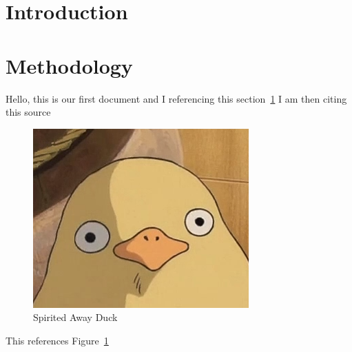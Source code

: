 \documentclass[11pt]{article}
\begin{document}
    \section{Introduction}\label{sec:introduction}

    \section{Methodology}\label{sec:methodology}

    Hello, this is our first document and I referencing this section~\ref{sec:introduction}
    I am then citing this source~\cite{ani2019victory}

    \begin{figure}
        \centering
        \includegraphics{figures/SpiritedAwayDuck3}
        \caption{Spirited Away Duck}
        \label{fig:SpiritedAwayDuck}
    \end{figure}


    This references Figure~\ref{fig:SpiritedAwayDuck}

    
    
\end{document}
